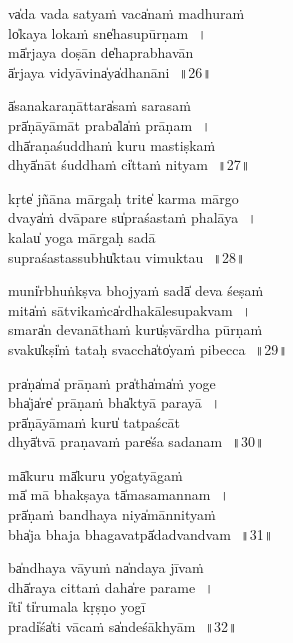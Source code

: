 \documentclass[parskip, DIV=14, pagenumber=head,top]{scrartcl}
\begin{document}
va̍da vada satyaṁ va॒ca̍naṁ madhuraṁ\\
lo̍kaya lokaṁ sne̍hasupūrṇam\,~।\\
mā̍rjaya doṣān de̍haprabhavān\\
ā̍rjaya vidyāvi॒na̍ya̍dhanāni\,~॥26॥

ā̍sanakaraṇātta॒ra̍saṁ sarasaṁ\\
prā̍ṇāyāmāt pra॒ba̍la̍ṁ prāṇam\,~।\\
dhā̍raṇaśuddhaṁ kuru mastiṣkaṁ\\
dhyā̍nāt śuddhaṁ ci̍ttaṁ nityam\,~॥27॥

kṛ॒te̍ jñāna mārgaḥ tri॒te̍ karma mārgo\\
dva॒ya̍ṁ dvāpare su̍praśastaṁ phalāya\,~।\\
ka॒lau̍ yoga mārgaḥ sadā\\
su॒praśastassu॒bhu̍ktau vimuktau\,~॥28॥

mu॒ni̍rbhuṅkṣva bhojyaṁ sa॒dā̍ deva śeṣaṁ\\
mi॒ta̍ṁ sātvikaṁca̍rdhakālesupakvam\,~।\\
sma॒ra̍n devanāthaṁ ku॒ru̍ṣvārdha pūrṇaṁ\\
sva॒ku̍kṣi̍ṁ tataḥ svaccha̍to̍yaṁ pibecca\,~॥29॥

\newpage 

pra̍ṇa̍ma̍ prāṇaṁ pra̍tha̍ma̍ṁ yoge\\
bha̍ja̍re̍ prāṇaṁ bha̍ktyā parayā\,~।\\
prā̍ṇāyāmaṁ ku॒ru̍ tatpaścāt\\
dhyā̍tvā praṇavaṁ pa॒re̍śa sadanam\,~॥30॥

mā̍kuru॒ mā̍kuru॒ yo̍gatyāgaṁ\\
mā̍ mā bhakṣaya tā̍masamannam\,~।\\
prā̍ṇaṁ bandhaya ni॒ya̍mānnityaṁ\\
bha̍ja bhaja bhagavatpā̍dadvandvam\,~॥31॥

ba̍ndhaya vāyuṁ na̍ndaya jīvaṁ\\
dhā̍raya cittaṁ da॒ha̍re parame\,~।\\
i̍ti̍ ti̍rumala kṛṣṇo yogī\\
pra॒di̍śa̍ti vācaṁ sa̍ndeśākhyām\,~॥32॥
\end{document}
